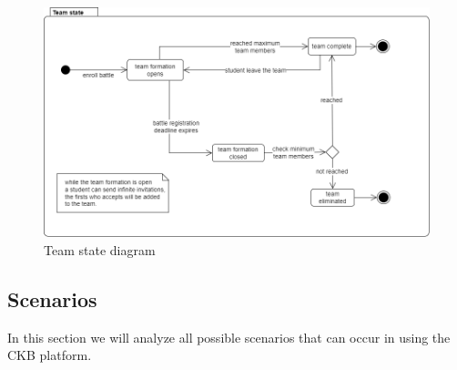 \begin{figure}[H]
    \centering
    \includegraphics[scale=0.5]{images/team_state.png}
    \caption{Team state diagram}
    \label{fig:team_state}
\end{figure}
\clearpage

\subsection{Scenarios}\label{desc:scenarios}
In this section we will analyze all possible scenarios that can occur in using the CKB platform.

